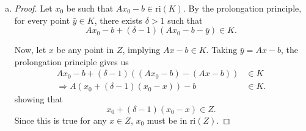 \documentclass{article}
\theoremstyle{plain}
\theoremstyle{definition}
\theoremstyle{remark}
\begin{document}
\begin{solution}
\begin{enumerate}[(a)]
{\begin{proof}
            \end{proof}
        }
        \item {
            \begin{proof}
                Let \( x_0 \) be such that \( Ax_0 - b \in \text{ri}(K) \). By the prolongation principle, for every point \( \bar{y} \in K \), there exists \( \delta > 1 \) such that
                \[ Ax_0 - b + (\delta - 1)(Ax_0 - b - \bar{y}) \in K. \]

                Now, let \( x \) be any point in \( Z \), implying \( Ax - b \in K \).
                Taking \( \bar{y} = Ax - b \), the prolongation principle gives us
                \begin{align*}
                    Ax_0 - b + (\delta - 1)((Ax_0 - b) - (Ax - b)) &\in K \\
                    \Rightarrow A(x_0 + (\delta - 1)(x_0 - x))-b &\in K.
                \end{align*}
                showing that
                \[ x_0 + (\delta - 1)(x_0 - x) \in Z. \]
                Since this is true for any \( x \in Z \), \( x_0 \) must be in \( \text{ri}(Z) \).


\end{proof}}
\end{enumerate}
\end{solution}
\end{document}
